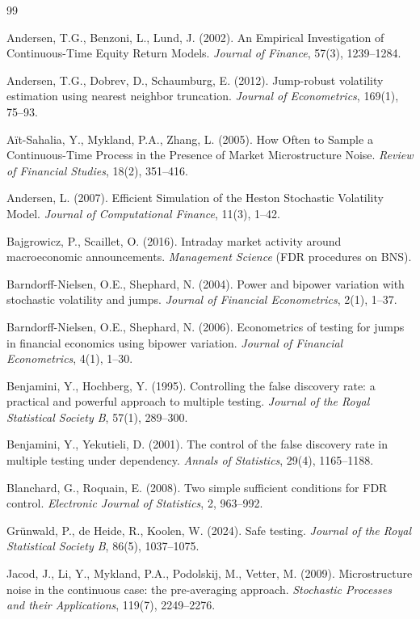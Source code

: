 \documentclass[11pt,a4paper,twocolumn]{article}
\theoremstyle{plain}
\theoremstyle{definition}
\theoremstyle{remark}
\begin{document}
\begin{thebibliography}{99}

Andersen, T.G., Benzoni, L., Lund, J. (2002).
An Empirical Investigation of Continuous-Time Equity Return Models.
\emph{Journal of Finance}, 57(3), 1239--1284.

Andersen, T.G., Dobrev, D., Schaumburg, E. (2012).
Jump-robust volatility estimation using nearest neighbor truncation.
\emph{Journal of Econometrics}, 169(1), 75--93.

A\"it-Sahalia, Y., Mykland, P.A., Zhang, L. (2005).
How Often to Sample a Continuous-Time Process in the Presence of Market
Microstructure Noise.
\emph{Review of Financial Studies}, 18(2), 351--416.

Andersen, L. (2007).
Efficient Simulation of the Heston Stochastic Volatility Model.
\emph{Journal of Computational Finance}, 11(3), 1--42.

Bajgrowicz, P., Scaillet, O. (2016).
Intraday market activity around macroeconomic announcements.
\emph{Management Science} (FDR procedures on BNS).

Barndorff-Nielsen, O.E., Shephard, N. (2004).
Power and bipower variation with stochastic volatility and jumps.
\emph{Journal of Financial Econometrics}, 2(1), 1--37.

Barndorff-Nielsen, O.E., Shephard, N. (2006).
Econometrics of testing for jumps in financial economics using bipower
variation.
\emph{Journal of Financial Econometrics}, 4(1), 1--30.

Benjamini, Y., Hochberg, Y. (1995).
Controlling the false discovery rate: a practical and powerful approach to
multiple testing.
\emph{Journal of the Royal Statistical Society B}, 57(1), 289--300.

Benjamini, Y., Yekutieli, D. (2001).
The control of the false discovery rate in multiple testing under
dependency.
\emph{Annals of Statistics}, 29(4), 1165--1188.

Blanchard, G., Roquain, E. (2008).
Two simple sufficient conditions for FDR control.
\emph{Electronic Journal of Statistics}, 2, 963--992.

Gr\"unwald, P., de Heide, R., Koolen, W. (2024).
Safe testing.
\emph{Journal of the Royal Statistical Society B}, 86(5), 1037--1075.

Jacod, J., Li, Y., Mykland, P.A., Podolskij, M., Vetter, M. (2009).
Microstructure noise in the continuous case: the pre-averaging approach.
\emph{Stochastic Processes and their Applications}, 119(7), 2249--2276.


\end{thebibliography}
\end{document}

